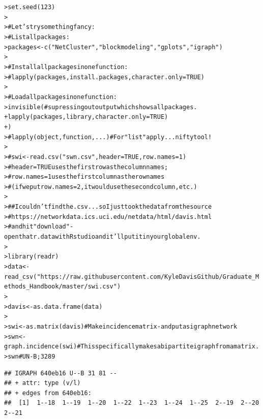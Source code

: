 \documentclass[12pt]{article}\usepackage[]{graphicx}\usepackage[]{color}
\makeatletter
\newcommand{\hlnum}[1]{\textcolor[rgb]{0.82,0.78,0.62}{#1}}%
\newcommand{\hlstr}[1]{\textcolor[rgb]{0.82,0.78,0.62}{#1}}%
\newcommand{\hlcom}[1]{\textcolor[rgb]{0.404,0.408,0.42}{#1}}%
\newcommand{\hlstd}[1]{\textcolor[rgb]{0.882,0.878,0.898}{#1}}%
\newcommand{\hlkwb}[1]{\textcolor[rgb]{0.902,0.675,0.196}{#1}}%
\newcommand{\hlkwc}[1]{\textcolor[rgb]{0.812,0.522,0.388}{#1}}%
\newcommand{\hlkwd}[1]{\textcolor[rgb]{0.733,0.388,0.812}{#1}}%
\newenvironment{kframe}{%
 \def\at@end@of@kframe{}%
 \ifinner\ifhmode%
  \def\at@end@of@kframe{\end{minipage}}%
  \begin{minipage}{\columnwidth}%
 \fi\fi%
 \def\FrameCommand##1{\hskip\@totalleftmargin \hskip-\fboxsep
 \colorbox{shadecolor}{##1}\hskip-\fboxsep
     \hskip-\linewidth \hskip-\@totalleftmargin \hskip\columnwidth}%
 \MakeFramed {\advance\hsize-\width
   \@totalleftmargin\z@ \linewidth\hsize
   \@setminipage}}%
 {\par\unskip\endMakeFramed%
 \at@end@of@kframe}
\newenvironment{knitrout}{}{} %
\makeatother
\begin{document}
\begin{flushleft}
\begin{center}
\begin{knitrout}
\color{fgcolor}\begin{kframe}
\begin{alltt}
\hlstd{> }\hlkwd{set.seed}\hlstd{(}\hlnum{123}\hlstd{)}
\hlstd{> }
\hlstd{> }\hlcom{# Let's try something fancy:}
\hlstd{> }\hlcom{# List all packages:}
\hlstd{> }\hlstd{packages} \hlkwb{<-} \hlkwd{c}\hlstd{(}\hlstr{"NetCluster"}\hlstd{,} \hlstr{"blockmodeling"}\hlstd{,} \hlstr{"gplots"}\hlstd{,} \hlstr{"igraph"}\hlstd{)}
\hlstd{> }
\hlstd{> }\hlcom{# Install all packages in one function:}
\hlstd{> }\hlcom{#   lapply(packages, install.packages, character.only = TRUE)}
\hlstd{> }
\hlstd{> }\hlcom{# Load all packages in one function:}
\hlstd{> }\hlkwd{invisible}\hlstd{(} \hlcom{# supressing out output which shows all packages.}
\hlstd{+ }\hlkwd{lapply}\hlstd{(packages, library,} \hlkwc{character.only} \hlstd{=} \hlnum{TRUE}\hlstd{)}
\hlstd{+ }\hlstd{)}
\hlstd{> }\hlcom{#  lapply(object, function, ...)  # For "list" apply... nifty tool!}
\hlstd{> }
\hlstd{> }\hlcom{# swi <- read.csv("swn.csv", header = TRUE, row.names = 1)}
\hlstd{> }\hlcom{# header = TRUE uses the first row as the column names;}
\hlstd{> }\hlcom{#  row.names = 1 uses the first column as the row names}
\hlstd{> }\hlcom{#    (if we put row.names = 2, it would use the second column, etc.)}
\hlstd{> }
\hlstd{> }\hlcom{## I couldn't find the .csv... so I just took the data from the source}
\hlstd{> }\hlcom{# https://networkdata.ics.uci.edu/netdata/html/davis.html}
\hlstd{> }\hlcom{#  and hit "download" - open that r.data with Rstudio and it'll put it in your global env.}
\hlstd{> }
\hlstd{> }\hlkwd{library}\hlstd{(readr)}
\hlstd{> }\hlstd{data} \hlkwb{<-} \hlkwd{read_csv}\hlstd{(}\hlstr{"https://raw.githubusercontent.com/KyleDavisGithub/Graduate_Methods_Handbook/master/swi.csv"}\hlstd{)}
\hlstd{> }
\hlstd{> }\hlstd{davis} \hlkwb{<-} \hlkwd{as.data.frame}\hlstd{(data)}
\hlstd{> }
\hlstd{> }\hlstd{swi} \hlkwb{<-} \hlkwd{as.matrix}\hlstd{(davis)} \hlcom{# Make incidence matrix - and put as igraph network}
\hlstd{> }\hlstd{swn} \hlkwb{<-} \hlkwd{graph.incidence}\hlstd{(swi)} \hlcom{# This specifically makes a bipartite igraph from a matrix.}
\hlstd{> }\hlstd{swn} \hlcom{# UN-B ; 32 89}
\end{alltt}
\begin{verbatim}
## IGRAPH 640eb16 U--B 31 81 -- 
## + attr: type (v/l)
## + edges from 640eb16:
##  [1]  1--18  1--19  1--20  1--22  1--23  1--24  1--25  2--19  2--20  2--21

\end{verbatim}
\end{kframe}
\end{knitrout}
\end{center}
\end{flushleft}
\end{document}
